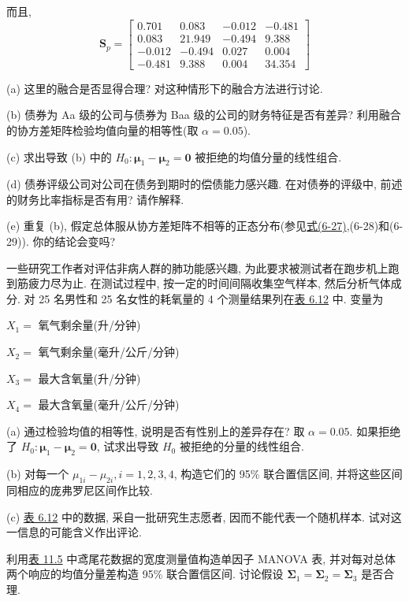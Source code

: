 
而且,
\[
\mathbf{S}_p=\begin{bmatrix}0.701&0.083&-0.012&-0.481\\0.083&21.949&-0.494&9.388\\-0.012&-0.494&0.027&0.004\\-0.481&9.388&0.004&34.354\end{bmatrix}
\]

\noindent (a) 这里的融合是否显得合理? 对这种情形下的融合方法进行讨论.

\noindent (b) 债券为 Aa 级的公司与债券为 Baa 级的公司的财务特征是否有差异? 利用融合的协方差矩阵检验均值向量的相等性(取 $\alpha=0.05$).

\noindent (c) 求出导致 (b) 中的 $H_0: \boldsymbol{\mu}_1-\boldsymbol{\mu}_2=\mathbf{0}$ 被拒绝的均值分量的线性组合.

\noindent (d) 债券评级公司对公司在债务到期时的偿债能力感兴趣. 在对债券的评级中, 前述的财务比率指标是否有用? 请作解释.

\noindent (e) 重复 (b), 假定总体服从协方差矩阵不相等的正态分布(参见\hyperref[eq:6-27]{式(6-27)},(6-28)和(6-29)). 你的结论会变吗?

\quad 一些研究工作者对评估非病人群的肺功能感兴趣, 为此要求被测试者在跑步机上跑到筋疲力尽为止. 在测试过程中, 按一定的时间间隔收集空气样本, 然后分析气体成分. 对 25 名男性和 25 名女性的耗氧量的 4 个测量结果列在\hyperref[tab:6.12]{表 6.12} 中. 变量为

\noindent $X_1=$ 氧气剩余量(升/分钟)

\noindent $X_2=$ 氧气剩余量(毫升/公斤/分钟)

\noindent $X_3=$ 最大含氧量(升/分钟)

\noindent $X_4=$ 最大含氧量(毫升/公斤/分钟)

\noindent (a) 通过检验均值的相等性, 说明是否有性别上的差异存在? 取 $\alpha=0.05$. 如果拒绝了 $H_0: \boldsymbol{\mu}_1-\boldsymbol{\mu}_2=\mathbf{0}$, 试求出导致 $H_0$ 被拒绝的分量的线性组合.

\noindent (b) 对每一个 $\mu_{1i}-\mu_{2i}, i=1,2,3,4$, 构造它们的 95\% 联合置信区间, 并将这些区间同相应的庞弗罗尼区间作比较.

\noindent (c) \hyperref[tab:6.12]{表 6.12} 中的数据, 采自一批研究生志愿者, 因而不能代表一个随机样本. 试对这一信息的可能含义作出评论.

\quad 利用\hyperref[tab:11.5]{表 11.5} 中鸢尾花数据的宽度测量值构造单因子 MANOVA 表, 并对每对总体两个响应的均值分量差构造 95\% 联合置信区间. 讨论假设 $\boldsymbol{\Sigma}_1=\boldsymbol{\Sigma}_2=\boldsymbol{\Sigma}_3$ 是否合理.

